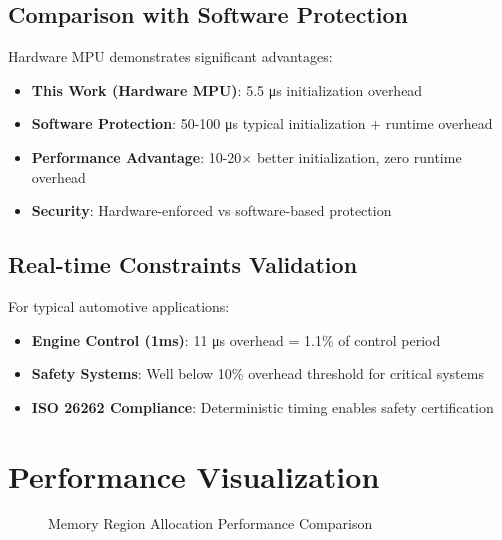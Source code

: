 \subsection{Comparison with Software Protection}

Hardware MPU demonstrates significant advantages:
\begin{itemize}
    \item \textbf{This Work (Hardware MPU)}: 5.5 μs initialization overhead
    \item \textbf{Software Protection}: 50-100 μs typical initialization + runtime overhead
    \item \textbf{Performance Advantage}: 10-20× better initialization, zero runtime overhead
    \item \textbf{Security}: Hardware-enforced vs software-based protection
\end{itemize}

\subsection{Real-time Constraints Validation}

For typical automotive applications:
\begin{itemize}
    \item \textbf{Engine Control (1ms)}: 11 μs overhead = 1.1\% of control period
    \item \textbf{Safety Systems}: Well below 10\% overhead threshold for critical systems
    \item \textbf{ISO 26262 Compliance}: Deterministic timing enables safety certification
\end{itemize}

\section{Performance Visualization}

\begin{figure}[h]
\centering
{}
\caption{Memory Region Allocation Performance Comparison}
\label{fig:performance-comparison}
\end{figure}


